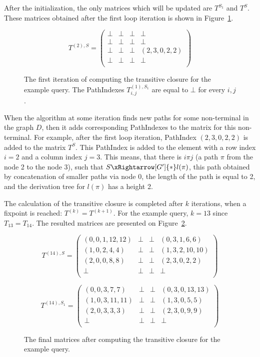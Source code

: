 After the initialization, the only matrices which will be updated are $T^{S_1}$ and $T^{S}$. These matrices obtained after the first loop iteration is shown in Figure~\ref{ExampleQueryFirstIteration}.

\begin{figure}[h]
	\[
	T^{(2),S} = \begin{pmatrix}
	\bot & \bot       & \bot & \bot       \\
	\bot & \bot & \bot       & \bot \\
	\bot       & \bot & \bot & (2,3,0,2,2) \\
	\bot       & \bot & \bot & \bot \\
	\end{pmatrix}
	\]
	\caption{The first iteration of computing the transitive closure for the example query. The PathIndexes $T^{(1),S_1}_{i,j}$ are equal to $\bot$ for every $i,j$.}
	\label{ExampleQueryFirstIteration}
\end{figure}

When the algorithm at some iteration finds new paths for some non-terminal in the graph $D$, then it adds corresponding PathIndexes to the matrix for this non-terminal. For example, after the first loop iteration, PathIndex $(2,3,0,2,2)$ is added to the matrix $T^{S}$. This PathIndex is added to the element with a row index $i = 2$ and a column index $j = 3$. This means, that there is $i\pi j$ (a path $\pi$ from the node 2 to the node 3), such that $S \xRightarrow[G']{*} l(\pi)$, this path obtained by concatenation of smaller paths via node 0, the length of the path is equal to 2, and the derivation tree for $l(\pi)$ has a height 2.

The calculation of the transitive closure is completed after $k$ iterations, when a fixpoint is reached: $T^{(k)} = T^{(k+1)}$. For the example query, $k = 13$ since $T_{13} = T_{14}$. The resulted matrices are presented on Figure~\ref{ExampleQueryFinalMatrices}.

\begin{figure}[h]
	\[
	T^{(14),S} = \begin{pmatrix}
	(0,0,1,12,12) & \bot       & \bot & (0,3,1,6,6)       \\
	(1,0,2,4,4) & \bot & \bot       & (1,3,2,10,10) \\
	(2,0,0,8,8)       & \bot & \bot & (2,3,0,2,2) \\
	\bot       & \bot & \bot & \bot \\
	\end{pmatrix}
	\]
	
	\[
	T^{(14),S_1} = \begin{pmatrix}
	(0,0,3,7,7)  & \bot       & \bot & (0,3,0,13,13)       \\
	(1,0,3,11,11) & \bot & \bot       & (1,3,0,5,5) \\
	(2,0,3,3,3)       & \bot & \bot & (2,3,0,9,9) \\
	\bot       & \bot & \bot & \bot \\
	\end{pmatrix}
	\]
	\caption{The final matrices after computing the transitive closure for the example query.}
	\label{ExampleQueryFinalMatrices}
\end{figure}


